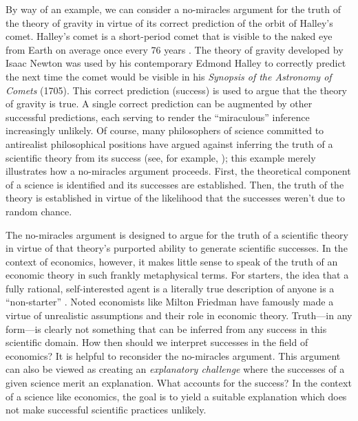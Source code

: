 By way of an example, we can consider a no-miracles argument for the truth of the theory of gravity in virtue of its correct prediction of the orbit of Halley's comet. Halley's comet is a short-period comet that is visible to the naked eye from Earth on average once every 76 years \autocite{nasa_halley}. The theory of gravity developed by Isaac Newton was used by his contemporary Edmond Halley to correctly predict the next time the comet would be visible in his \textit{Synopsis of the Astronomy of Comets} (1705). This correct prediction (success) is used to argue that the theory of gravity is true. A single correct prediction can be augmented by other successful predictions, each serving to render the ``miraculous'' inference increasingly unlikely. Of course, many philosophers of science committed to antirealist philosophical positions have argued against inferring the truth of a scientific theory from its success (see, for example, \cite{stanford2000}); this example merely illustrates how a no-miracles argument proceeds. First, the theoretical component of a science is identified and its successes are established. Then, the truth of the theory is established in virtue of the likelihood that the successes weren't due to random chance.

The no-miracles argument is designed to argue for the truth of a scientific theory in virtue of that theory's purported ability to generate scientific successes. In the context of economics, however, it makes little sense to speak of the truth of an economic theory in such frankly metaphysical terms. For starters, the idea that a fully rational, self-interested agent is a literally true description of anyone is a ``non-starter'' \autocite[328]{alexandrova2009}. Noted economists like Milton Friedman \autocite*{friedman1953} have famously made a virtue of unrealistic assumptions and their role in economic theory. Truth---in any form---is clearly not something that can be inferred from any success in this scientific domain. How then should we interpret successes in the field of economics? It is helpful to reconsider the no-miracles argument. This argument can also be viewed as creating an \textit{explanatory challenge} where the successes of a given science merit an explanation. What accounts for the success? In the context of a science like economics, the goal is to yield a suitable explanation which does not make successful scientific practices unlikely.

